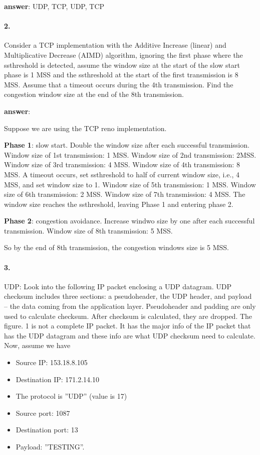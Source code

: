 \documentclass{article}
\begin{document}
\textbf{answer}: UDP, TCP, UDP, TCP

\paragraph{2.} Consider a TCP implementation with the Additive Increase (linear) and Multiplicative Decrease (AIMD) algorithm, ignoring the first phase where the ssthreshold is detected, assume the window size at the start of the slow start phase is 1 MSS and the ssthreshold at the start of the first transmission is 8 MSS. Assume that a timeout occurs during the 4th transmission. Find the congestion window size at the end of the 8th transmission.

\textbf{answer}: 

Suppose we are using the TCP reno implementation.

\textbf{Phase 1}: slow start. Double the window size after each successful transmission. Window size of 1st transmission: 1 MSS. Window size of 2nd transmission: 2MSS. Window size of 3rd transmission: 4 MSS. Window size of 4th transmission: 8 MSS. A timeout occurs, set ssthreshold to half of current window size, i.e., 4 MSS, and set window size to 1. Window size of 5th transmission: 1 MSS. Window size of 6th transmission: 2 MSS. Window size of 7th transmission: 4 MSS. The window size reaches the ssthreshold, leaving Phase 1 and entering phase 2.

\textbf{Phase 2}: congestion avoidance. Increase windwo size by one after each successful transmission. Window size of 8th transmission: 5 MSS.

So by the end of 8th transmission, the congestion windows size is 5 MSS.

\paragraph{3.} UDP: Look into the following IP packet enclosing a UDP datagram. UDP checksum includes three sections: a pseudoheader, the UDP header, and payload – the data coming from the application layer.   Pseudoheader and padding are only used to calculate checksum. After checksum is calculated, they are dropped. The figure. 1 is not a complete IP packet. It has the major info of the IP packet that has the UDP datagram and these info are what UDP checksum need to calculate. Now, assume we have

\begin{itemize}
    \item Source IP: 153.18.8.105
    \item Destination IP: 171.2.14.10
    \item The protocol is ”UDP” (value is 17)
    \item Source port: 1087
    \item Destination port: 13
    \item Payload: ”TESTING”.
\end{itemize}
\end{document}
